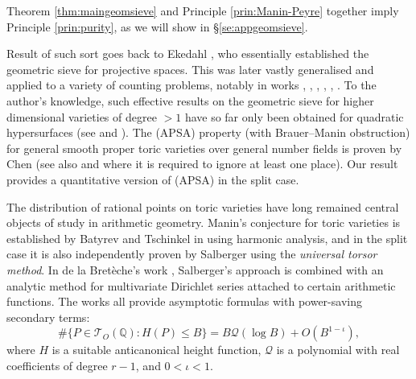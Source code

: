 \documentclass[11pt,letterpaper]{amsart}
\newcommand{\BQ}{{\mathbb {Q}}}
\newcommand{\CQ}{{\mathcal {Q}}}
\newcommand{\CT}{{\mathcal {T}}}
\theoremstyle{plain}
\numberwithin{equation}{section}
\theoremstyle{definition}
\theoremstyle{remark}
\begin{document}
Theorem \ref{thm:maingeomsieve} and Principle \ref{prin:Manin-Peyre} together imply Principle \ref{prin:purity}, as we will show in \S\ref{se:appgeomsieve}. 

Result of such sort goes back to Ekedahl \cite{Ekedahl}, who essentially established the geometric sieve for projective spaces. This was later vastly generalised and applied to a variety of counting problems, notably in works \cite[\S9]{Poonen-Stoll}, \cite[\S2.6]{Bhargava-Shankar}, \cite{Poonen}, \cite[\S3]{BBL}, \cite[\S3]{Cao-Huang2}, \cite[\S7]{Browning-HB}. To the author's knowledge, such effective results on the geometric sieve for higher dimensional varieties of degree $>1$ have so far only been obtained for quadratic hypersurfaces (see \cite[Theorem 1.6]{Cao-Huang2} and \cite[Theorems 1.1--1.3]{Browning-HB}). The (APSA) property (with Brauer--Manin obstruction) for general smooth proper toric varieties over general number fields is proven by Chen \cite[Theorem 1.7]{ChenS} (see also \cite[Theorem 1.1]{Wei} and \cite[Theorem 1.3]{Cao-Liang-Xu} where it is required to ignore at least one place). Our result provides a quantitative version of (APSA) in the split case.

The distribution of rational points on toric varieties have long remained central objects of study in arithmetic geometry. Manin's conjecture for toric varieties is established by Batyrev and Tschinkel in \cite{Bat-Tsch1,Bat-Tsch2} using harmonic analysis, and in the split case it is also independently proven by Salberger \cite{Salberger} using the \emph{universal torsor method}. In de la Bretèche's work  \cite{Breteche,Breteche2}, Salberger's approach is combined with an analytic method for multivariate Dirichlet series attached to certain arithmetic functions. The works \cite{Bat-Tsch1,Bat-Tsch2,Breteche} all provide asymptotic formulas with power-saving secondary terms: $$\#\{P\in \CT_{O}(\BQ):H(P)\leqslant B\}=B\CQ(\log B)+O(B^{1-\iota}),$$ where $H$ is a suitable anticanonical height function, $\CQ$ is a polynomial with real coefficients of degree $r-1$, and $0<\iota<1$.
\end{document}

